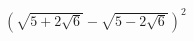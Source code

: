 \begin{ex}[type=expression]
	\begin{condition}
		\( (\sqrt{5+2\sqrt{6}}-\sqrt{5-2\sqrt{6}})^2 \)
	\end{condition}
\end{ex}